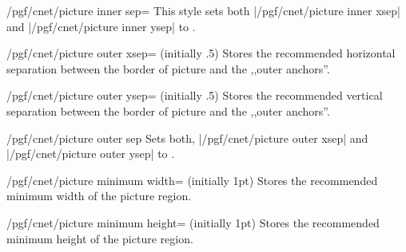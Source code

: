 \documentclass[a4paper]{ltxdoc}
\begin{document}
\begin{key}{/pgf/cnet/picture inner sep=}
  This style sets both |/pgf/cnet/picture inner xsep| and
  |/pgf/cnet/picture inner ysep| to .
\begin{codeexample}[]
\end{codeexample}
\end{key}

\begin{key}{/pgf/cnet/picture outer xsep= (initially .5\string\pgflinewidth)}
  Stores the recommended horizontal separation between the border of picture
  and the ,,outer anchors''.
\end{key}

\begin{key}{/pgf/cnet/picture outer ysep= (initially .5\string\pgflinewidth)}
  Stores the recommended vertical separation between the border of picture
  and the ,,outer anchors''.
\end{key}

\begin{key}{/pgf/cnet/picture outer sep}
  Sets both, |/pgf/cnet/picture outer xsep|
  and |/pgf/cnet/picture outer ysep| to .
\end{key}

\begin{key}{/pgf/cnet/picture minimum width= (initially 1pt)}
  Stores the recommended minimum width of the picture region.
\end{key}

\begin{key}{/pgf/cnet/picture minimum height= (initially 1pt)}
  Stores the recommended minimum height of the picture region.
\end{key}
\end{document}
